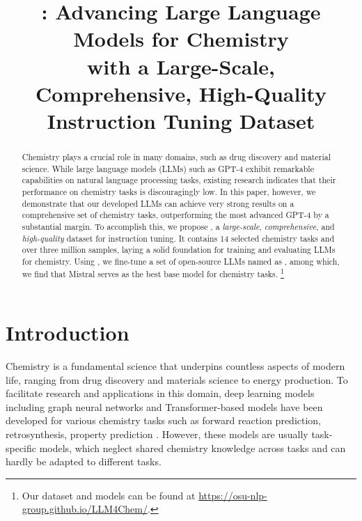 \title{\modelname: Advancing Large Language Models for Chemistry \\with a Large-Scale, Comprehensive, High-Quality Instruction Tuning Dataset}



\def\thefootnote{*}\def\thefootnote{\arabic{footnote}}

\maketitle

\begin{abstract}
Chemistry plays a crucial role in many domains, such as drug discovery and material science.
While large language models (LLMs) such as GPT-4 exhibit remarkable capabilities on natural language processing tasks, existing research indicates that their performance on chemistry tasks is discouragingly low. In this paper, however, we demonstrate that our developed LLMs can achieve very strong results on a comprehensive set of chemistry tasks, outperforming the most advanced GPT-4  by a substantial margin.
To accomplish this, we propose \datasetname, a \textit{large-scale}, \textit{comprehensive}, and \textit{high-quality} dataset for instruction tuning. It contains 14 selected chemistry tasks and over three million samples, laying a solid foundation for training and evaluating LLMs for chemistry. Using \datasetname, we fine-tune a set of open-source LLMs named as \modelname, among which, we find that Mistral serves as the best base model for chemistry tasks. 
\footnote{Our dataset and models can be found at \url{https://osu-nlp-group.github.io/LLM4Chem/}.}
\end{abstract}

\section{Introduction}

Chemistry is a fundamental science that underpins countless aspects of modern life, ranging from drug discovery and materials science to energy production. To facilitate research and applications in this domain, deep learning models including graph neural networks \citep{kipf2017semisupervised} and Transformer-based models \citep{vaswani2017attention} have been developed for various chemistry tasks such as forward reaction prediction, retrosynthesis, property prediction \citep{schwaller2019molecular,Zhong2022,chen2023g2retro,zhou2023unimol}. However, these models are usually task-specific models, which neglect shared chemistry knowledge across tasks and can hardly be adapted to different tasks.

